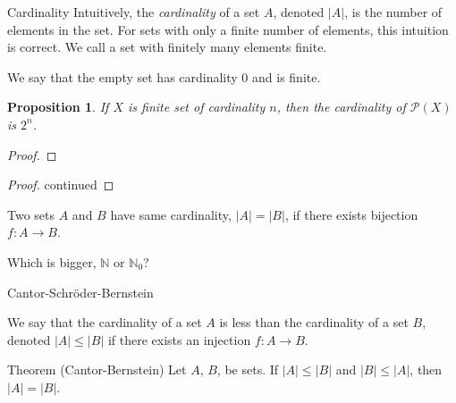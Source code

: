\documentclass [aspectratio=169]{beamer}
\newcommand{\N}{{\mathbb{N}}}
\newcommand{\cP}{\mathcal{P}}
\newtheorem{proposition}[theorem]{Proposition}
\begin{document}
\begin{frame}{Cardinality}
Intuitively, the \emph{cardinality} of a set $A$, denoted $|A|$, is the number of elements in the set. For sets with only a finite number of elements, this intuition is correct. We call a set with finitely many elements finite. 

\vspace{1em}

We say that the empty set has cardinality 0 and is finite.



\end{frame}


\begin{frame}

\begin{proposition}
 If $X$ is finite set of cardinality $n$, then the cardinality of $\cP(X)$ is $2^n$.
\end{proposition}

\begin{proof}
\vspace{4cm}
\end{proof}
\end{frame}

\begin{frame}

\begin{proof}
continued
\vspace{6cm}
\end{proof}
\end{frame}


\begin{frame}
\begin{definition}
Two sets $A$ and $B$ have same cardinality, $|A| = |B|$, if there exists bijection $f:A \to B$.
\end{definition}

\begin{example}
Which is bigger, $\N$ or $\N_0$? \\
\vspace{4cm}
\end{example}
\end{frame}


\begin{frame}{Cantor-Schr\"{o}der-Bernstein}
\begin{definition}
We say that the cardinality of a set $A$ is less than the cardinality of a set $B$, denoted $|A| \leq |B|$ if there exists an injection $f:A \to B$.
\end{definition}

\vspace{1cm}

\begin{alertblock}{Theorem (Cantor-Bernstein)}
Let $A$, $B$, be sets. If $|A| \leq |B|$ and $|B| \leq |A|$, then $|A| = |B|$.
\end{alertblock}

\end{frame}
\end{document}
